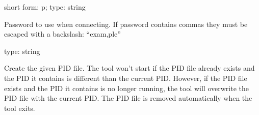 \documentclass[letterpaper,10pt,english]{sphinxmanual}
\begin{document}

\begin{fulllineitems}
\label{\detokenize{mariadb-archiver:cmdoption-mariadb-archiver-password}}
\sphinxAtStartPar
short form: \sphinxhyphen{}p; type: string

\sphinxAtStartPar
Password to use when connecting.
If password contains commas they must be escaped with a backslash: “exam,ple”

\end{fulllineitems}


\begin{fulllineitems}
\label{\detokenize{mariadb-archiver:cmdoption-mariadb-archiver-pid}}
\sphinxAtStartPar
type: string

\sphinxAtStartPar
Create the given PID file.  The tool won’t start if the PID file already
exists and the PID it contains is different than the current PID.  However,
if the PID file exists and the PID it contains is no longer running, the
tool will overwrite the PID file with the current PID.  The PID file is
removed automatically when the tool exits.

\end{fulllineitems}

\end{document}
